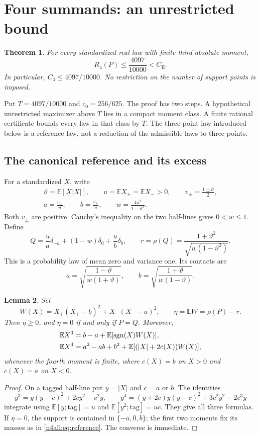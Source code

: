 \documentclass[11pt,a4paper]{article}
\numberwithin{equation}{section}
\newtheorem{theorem}{Theorem}[section]
\newtheorem{lemma}[theorem]{Lemma}
\theoremstyle{definition}
\theoremstyle{remark}
\newcommand{\E}{\mathbb E}
\newcommand{\CE}{C_{\mathrm E}}
\DeclareMathOperator{\sgn}{sgn}
\begin{document}
\section{Four summands: an unrestricted bound}\label{n4all:section}

\begin{theorem}\label{n4all:thm:main}
For every standardized real law with finite third absolute moment,
\[
 R_4(P)\le\frac{4097}{10000}<\CE.
\]
In particular, $C_4\le4097/10000$. No restriction on the number of
support points is imposed.
\end{theorem}

Put $T=4097/10000$ and $c_0=256/625$. The proof has two steps.
A hypothetical unrestricted maximizer above $T$ lies in a compact
moment class. A finite rational certificate bounds every law in that
class by $T$. The three-point law introduced below is a reference law,
not a reduction of the admissible laws to three points.

\subsection{The canonical reference and its excess}
For a standardized $X$, write
\[
 \begin{gathered}
 \vartheta=\E[X|X|],\qquad u=\E X_+=\E X_->0,\qquad
 v_\pm=\frac{1\pm\vartheta}{2},\\
 a=\frac{v_-}{u},\qquad b=\frac{v_+}{u},\qquad
 w=\frac{4u^2}{1-\vartheta^2}.
 \end{gathered}
\]
Both $v_\pm$ are positive. Cauchy's inequality on the two half-lines
gives $0<w\le1$. Define
\begin{equation}\label{n4all:eq:reference}
 Q=\frac{u}{a}\delta_{-a}+(1-w)\delta_0+\frac{u}{b}\delta_b,
 \qquad
 r=\rho(Q)=\frac{1+\vartheta^2}{\sqrt{w(1-\vartheta^2)}}.
\end{equation}
This is a probability law of mean zero and variance one. Its contacts
are
\[
 a=\sqrt{\frac{1-\vartheta}{w(1+\vartheta)}},\qquad
 b=\sqrt{\frac{1+\vartheta}{w(1-\vartheta)}}.
\]

\begin{lemma}\label{n4all:lem:excess}
Set
\[
 W(X)=X_+(X_+-b)^2+X_-(X_--a)^2,\qquad
 \eta=\E W=\rho(P)-r.
\]
Then $\eta\ge0$, and $\eta=0$ if and only if $P=Q$.
Moreover,
\begin{align}
 \E X^3&=b-a+\E[\sgn(X)W(X)],\notag\\
 \E X^4&=a^2-ab+b^2+
   \E[(|X|+2c(X))W(X)],\label{n4all:eq:physical-moments}
\end{align}
whenever the fourth moment is finite, where $c(X)=b$ on $X>0$ and
$c(X)=a$ on $X<0$.
\end{lemma}
\begin{proof}
On a tagged half-line put $y=|X|$ and $c=a$ or $b$. The identities
\[
 y^3=y(y-c)^2+2cy^2-c^2y,
 \qquad
 y^4=(y+2c)y(y-c)^2+3c^2y^2-2c^3y
\]
integrate using $\E[y;\text{tag}]=u$ and
$\E[y^2;\text{tag}]=uc$. They give all three formulas.
If $\eta=0$, the support is contained in $\{-a,0,b\}$; the first
two moments fix its masses as in \eqref{n4all:eq:reference}.
The converse is immediate.
\end{proof}
\end{document}
